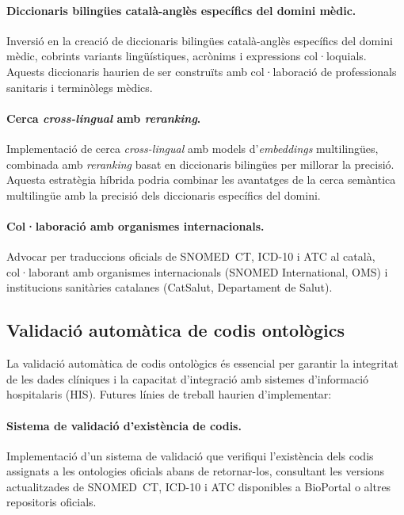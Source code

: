 \documentclass[CAT]{TFUOC}%
\begin{document}
\paragraph{Diccionaris bilingües català-anglès específics del domini mèdic.}
Inversió en la creació de diccionaris bilingües català-anglès específics del domini mèdic, cobrints variants lingüístiques, acrònims i expressions col·loquials. Aquests diccionaris haurien de ser construïts amb col·laboració de professionals sanitaris i terminòlegs mèdics.

\paragraph{Cerca \textit{cross-lingual} amb \textit{reranking}.}
Implementació de cerca \textit{cross-lingual} amb models d'\textit{embeddings} multilingües, combinada amb \textit{reranking} basat en diccionaris bilingües per millorar la precisió. Aquesta estratègia híbrida podria combinar les avantatges de la cerca semàntica multilingüe amb la precisió dels diccionaris específics del domini.

\paragraph{Col·laboració amb organismes internacionals.}
Advocar per traduccions oficials de SNOMED~CT, ICD-10 i ATC al català, col·laborant amb organismes internacionals (SNOMED International, OMS) i institucions sanitàries catalanes (CatSalut, Departament de Salut).

\subsection{Validació automàtica de codis ontològics}

La validació automàtica de codis ontològics és essencial per garantir la integritat de les dades clíniques i la capacitat d'integració amb sistemes d'informació hospitalaris (HIS). Futures línies de treball haurien d'implementar:

\paragraph{Sistema de validació d'existència de codis.}
Implementació d'un sistema de validació que verifiqui l'existència dels codis assignats a les ontologies oficials abans de retornar-los, consultant les versions actualitzades de SNOMED~CT, ICD-10 i ATC disponibles a BioPortal o altres repositoris oficials.
\end{document}

